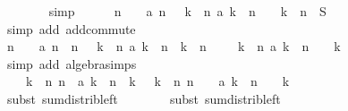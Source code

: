 \begin{isabellebody}
\ \ \ \ \ \ \isamarkupfalse%
\ simp\isanewline
\ \ \ \ \isamarkupfalse%
\ {\isachardoublequoteopen}{\isacharparenleft}n\ {\isacharplus}\ {}{\isacharparenright}\ {\isacharasterisk}\ {\isacharparenleft}a\ n\ {\isacharplus}\ {\isacharparenleft}{\isasymSum}\ k\ {\isacharless}\ n{\isachardot}\ a\ k\ {\isacharslash}\ {\isacharparenleft}n\ {\isacharplus}\ {}\ {\isacharminus}\ k{\isacharparenright}{\isacharparenright}{\isacharparenright}\ {\isacharequal}\ n\ {\isacharasterisk}\ {\isacharquery}S{}{\isachardoublequoteclose}\isanewline
\ \ \ \ \ \ \isamarkupfalse%
\ {\isacharparenleft}simp\ add{\isacharcolon}\ add{\isachardot}commute{\isacharparenright}\isanewline
\ \ \ \ \isamarkupfalse%
\ {\isachardoublequoteopen}{\isacharparenleft}n\ {\isacharplus}\ {}{\isacharparenright}\ {\isacharasterisk}\ a\ n\ {\isacharequal}\ n\ {\isacharasterisk}\ {\isacharparenleft}{\isasymSum}\ k\ {\isacharless}\ n{\isachardot}\ a\ k\ {\isacharslash}\ {\isacharparenleft}n\ {\isacharminus}\ k{\isacharparenright}{\isacharparenright}\ {\isacharminus}\ {\isacharparenleft}n\ {\isacharplus}\ {}{\isacharparenright}\ {\isacharasterisk}\ {\isacharparenleft}{\isasymSum}\ k\ {\isacharless}\ n{\isachardot}\ a\ k\ {\isacharslash}\ {\isacharparenleft}n\ {\isacharplus}\ {}\ {\isacharminus}\ k{\isacharparenright}{\isacharparenright}{\isachardoublequoteclose}\isanewline
\ \ \ \ \ \ \isamarkupfalse%
\ {\isacharparenleft}simp\ add{\isacharcolon}\ algebra{\isacharunderscore}simps{\isacharparenright}\isanewline
\ \ \ \ \isamarkupfalse%
\ \isamarkupfalse%
\ {\isachardoublequoteopen}{\isachardot}{\isachardot}{\isachardot}\ {\isacharequal}\ {\isacharparenleft}{\isasymSum}\ k\ {\isacharless}\ n{\isachardot}\ n\ {\isacharasterisk}\ a\ k\ {\isacharslash}\ {\isacharparenleft}n\ {\isacharminus}\ k{\isacharparenright}{\isacharparenright}\ {\isacharminus}\ {\isacharparenleft}{\isasymSum}\ k\ {\isacharless}\ n{\isachardot}\ {\isacharparenleft}n\ {\isacharplus}\ {}{\isacharparenright}\ {\isacharasterisk}\ a\ k\ {\isacharslash}\ {\isacharparenleft}n\ {\isacharplus}\ {}\ {\isacharminus}\ k{\isacharparenright}{\isacharparenright}{\isachardoublequoteclose}\isanewline
\ \ \ \ \ \ \isamarkupfalse%
\ {\isacharparenleft}subst\ sum{\isacharunderscore}distrib{\isacharunderscore}left{\isacharparenright}\isanewline
\ \ \ \ \ \ \isamarkupfalse%
\ {\isacharparenleft}subst\ sum{\isacharunderscore}distrib{\isacharunderscore}left{\isacharparenright}\isanewline

\end{isabellebody}
